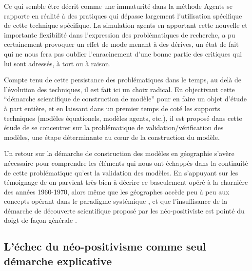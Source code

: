 {%

Ce qui semble être décrit comme une immaturité dans la méthode Agents \autocite{Heath2009} se rapporte en réalité à des pratiques qui dépasse largement l'utilisation spécifique de cette technique spécifique. La simulation agents en apportant cette nouvelle et importante flexibilité dans l'expression des problématiques de recherche, a pu certainement provoquer un effet de mode menant à des dérives, un état de fait qui ne nous fera pas oublier l'enracinement d'une bonne partie des critiques qui lui sont adressés, à tort ou à raison.

Compte tenu de cette persistance des problématiques dans le temps, au delà de l'évolution des techniques, il est fait ici un choix radical. En objectivant cette \enquote{démarche scientifique de construction de modèle} pour en faire un objet d'étude à part entière, et en laissant dans un premier temps de coté les supports techniques (modèles équationels, modèles agents, etc.), il est proposé dans cette étude de se concentrer sur la problématique de validation/vérification des modèles, une étape déterminante au cœur de la construction du modèle. 

Un retour sur la démarche de construction des modèles en géographie s'avère nécessaire pour comprendre les éléments qui nous ont échappés dans la continuité de cette problématique qu'est la validation des modèles. En s'appuyant sur les témoignage de \autocite{Batty2001, Pumain2003} on parvient très bien à décrire ce basculement opéré à la charnière des années 1960-1970, alors même que les géographes accède peu à peu aux concepts opérant dans le paradigme systémique \autocite{Harvey1969}, et que l'insuffisance de la démarche de découverte scientifique proposé par les néo-positiviste est pointé du doigt de façon générale \autocite{Simon1973} .

\subsection{L’échec du néo-positivisme comme seul démarche explicative} 

}
